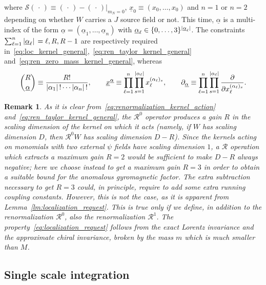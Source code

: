 \documentclass[a4paper, 11pt]{article}
\newcommand{\ren}{\mathcal{R}}								%
\newcommand{\kren}{\mathscr{R}}								%
\theoremstyle{thm}
\newtheorem{rmk}{Remark}
\begin{document}
where $\mathscr{S}(\, \cdot \,) \equiv (\, \cdot \,) - (\, \cdot \,) \vert_{m_N = 0}$, $\underline{x}_0 \equiv (x_0, \dots, x_0)$ and $n=1$ or $n=2$ depending on whether $W$ carries a $J$ source field or not. This time, $\underline{\alpha}$ is a multi-index of the form $\underline{\alpha} = (\underline{\alpha}_1, \dots, \underline{\alpha}_n)$ with $\underline{\alpha}_\ell \in \lbrace 0, \dots, 3 \rbrace^{\abs*{\underline{\alpha}_\ell}}$. The constraints $\sum_{\ell = 1}^n \abs*{\underline{\alpha}_\ell} = \ell, R, R-1$ are respectively required in~\eqref{eq:loc_kernel_general},~\eqref{eq:ren_taylor_kernel_general} and~\eqref{eq:ren_zero_mass_kernel_general}, whereas
\begin{equation}
\binom{R}{\underline{\alpha}} \equiv \frac{R!}{\abs*{\alpha_1}! \cdots \abs*{\alpha_n}!}, \qquad \underline{x}^{\underline{\alpha}} \equiv \prod_{\ell=1}^n \prod_{s=1}^{\abs*{\alpha_\ell}} x_\ell^{(\alpha_\ell)_s}, \qquad \partial_{\underline{\alpha}} \equiv \prod_{\ell=1}^n \prod_{s=1}^{\abs*{\alpha_\ell}} \frac{\partial}{\partial x_\ell^{(\alpha_\ell)_s}}.
\end{equation}

\begin{rmk}
As it is clear from~\eqref{eq:renormalization_kernel_action} and~\eqref{eq:ren_taylor_kernel_general}, the $\ren^0$ operator produces a gain $R$ in the scaling dimension of the kernel on which it acts (namely, if $W$ has scaling dimension $D$, then $\kren^0 W$ has scaling dimension $D - R$). Since the kernels acting on monomials with two external $\psi$ fields have scaling dimension $1$, a $\ren$ operation which extracts a maximum gain $R = 2$ would be sufficient to make $D - R$ always negative; here we choose instead to get a maximum gain $R = 3$ in order to obtain a suitable bound for the anomalous gyromagnetic factor. The extra subtraction necessary to get $R = 3$ could, in principle, require to add some extra running coupling constants. However, this is not the case, as it is apparent from Lemma~\ref{lm:localization_request}. This is true only if we define, in addition to the renormalization $\ren^0$, also the renormalization $\ren^1$. The property~\eqref{eq:localization_request} follows from the exact Lorentz invariance and the approximate chiral invariance, broken by the mass $m$ which is much smaller than $M$.
\end{rmk}

\subsection{Single scale integration}
\label{subsec:single_scale_integration}
\end{document}
